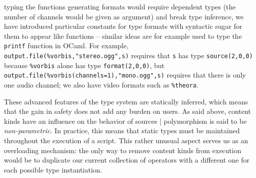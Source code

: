 \begin{itemize}
  typing the functions generating formats would require dependent types (the
  number of channels would be given as argument) and break type inference, we
  have introduced particular constants for type formats with syntactic sugar for
  them to appear like functions -- similar ideas are for example used to type
  the \texttt{printf} function in OCaml. For example,
  \verb$output.file(%vorbis,"stereo.ogg",s)$ requires that
  \verb.s. has type \verb.source(2,0,0). because \verb.%vorbis. alone
  has type \verb.format(2,0,0).,
  but \verb$output.file(%vorbis(channels=1),"mono.ogg",s)$
  requires that there is only one audio channel;
  we also have video formats such as \verb.%theora..
\end{itemize}

These advanced features of the type system are statically inferred, which means
that the gain in safety does not add any burden on users. As said above, content
kinds have an influence on the behavior of sources |
polymorphism is said to be \emph{non-parametric}.
In practice, this means that static types must be
maintained throughout the execution of a script. This rather unusual aspect
serves us as an overloading mechanism: the only way to remove content kinds from
execution would be to duplicate our current collection of operators with a
different one for each possible type instantiation.


